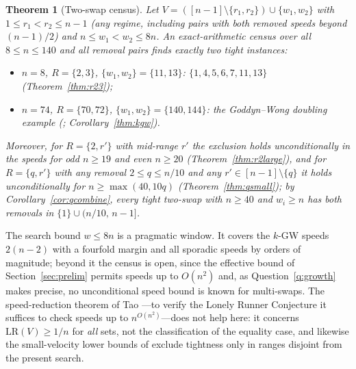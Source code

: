 \documentclass[11pt]{article}
\newtheorem{theorem}{Theorem}[section]
\theoremstyle{definition}
\newcommand{\LR}{\mathrm{LR}}
\begin{document}
\begin{theorem}[Two-swap census]\label{thm:twoswap}
Let $V=([n-1]\setminus\{r_1,r_2\})\cup\{w_1,w_2\}$ with
$1\le r_1<r_2\le n-1$ (any regime, including pairs with both removed
speeds beyond $(n-1)/2$) and $n\le w_1<w_2\le8n$.  An exact-arithmetic
census over all $8\le n\le140$ and all removal pairs finds exactly two
tight instances:
\begin{itemize}
\item $n=8$, $R=\{2,3\}$, $\{w_1,w_2\}=\{11,13\}$:
  $\{1,4,5,6,7,11,13\}$ (Theorem~\ref{thm:r23});
\item $n=74$, $R=\{70,72\}$, $\{w_1,w_2\}=\{140,144\}$: the
  Goddyn--Wong doubling example (\cite[Sec.~3]{GoddynWong2006};
  Corollary~\ref{thm:kgw}).
\end{itemize}
Moreover, for $R=\{2,r'\}$ with mid-range $r'$ the exclusion holds
unconditionally in the speeds for odd $n\ge19$ and even $n\ge20$
(Theorem~\ref{thm:r2large}), and for $R=\{q,r'\}$ with any removal
$2\le q\le n/10$ and any $r'\in[n-1]\setminus\{q\}$ it holds
unconditionally for $n\ge\max(40,10q)$ (Theorem~\ref{thm:qsmall}); by
Corollary~\ref{cor:qcombine}, every tight two-swap with $n\ge40$ and
$w_i\ge n$ has both removals in $\{1\}\cup(n/10,\,n-1]$.
\end{theorem}

The search bound $w\le8n$ is a pragmatic window.  It covers the $k$-GW
speeds $2(n-2)$ with a fourfold margin and all sporadic speeds by orders
of magnitude; beyond it the census is open, since the effective bound of
Section~\ref{sec:prelim} permits speeds up to $O(n^2)$ and, as
Question~\ref{q:growth} makes precise, no unconditional speed bound is
known for multi-swaps.  The speed-reduction theorem of Tao
\cite{Tao2017}---to verify the Lonely Runner Conjecture it suffices to
check speeds up to $n^{O(n^2)}$---does not help here: it concerns
$\LR(V)\ge1/n$ for \emph{all} sets, not the classification of the
equality case, and likewise the small-velocity lower bounds of
\cite{Tao2017} exclude tightness only in ranges disjoint from the
present search.
\end{document}
